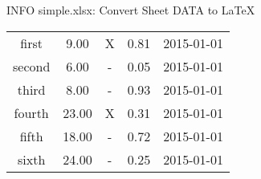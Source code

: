  INFO simple.xlsx: Convert Sheet DATA to LaTeX
%
%


%
%
\begin{tabular}{c|c|c|c|c|}
first & 9.00 & X & 0.81 & 2015-01-01\\
second & 6.00 & - & 0.05 & 2015-01-01\\
third & 8.00 & - & 0.93 & 2015-01-01\\
fourth & 23.00 & X & 0.31 & 2015-01-01\\
fifth & 18.00 & - & 0.72 & 2015-01-01\\
sixth & 24.00 & - & 0.25 & 2015-01-01
\end{tabular}
